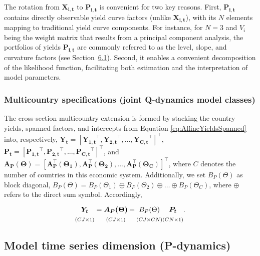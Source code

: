 The rotation from \(\boldsymbol{X_{i,t}}\) to \(\boldsymbol{P_{i,t}}\) is convenient for two key reasons. First, \(\boldsymbol{P_{i,t}}\) contains directly observable yield curve factors (unlike \(\boldsymbol{X_{i,t}}\)), with its \(N\) elements mapping to traditional yield curve components. For instance, for \(N=3\) and \(V_i\) being the weight matrix that results from a principal component analysis, the portfolios of yields \(\boldsymbol{P_{i,t}}\) are commonly referred to as the level, slope, and curvature factors (see Section~\hyperref[S:SpaFac]{6.1}). Second, it enables a convenient decomposition of the likelihood function, facilitating both estimation and the interpretation of model parameters.

\subsubsection{Multicountry specifications (joint Q-dynamics model classes)}\label{multicountry-specifications-joint-q-dynamics-model-classes}

The cross-section multicountry extension is formed by stacking the country yields, spanned factors, and intercepts from Equation \eqref{eq:AffineYieldsSpanned} into, respectively, \(\boldsymbol{Y_t}=[\boldsymbol{Y_{1,t}}^\top, \boldsymbol{Y_{2,t}}^\top, ...,\boldsymbol{Y_{C,t}}^\top]^\top\), \(\boldsymbol{P_t}=[\boldsymbol{P_{1,t}}^\top, \boldsymbol{P_{2,t}}^\top, ..., \boldsymbol{P_{C,t}}^\top]^\top\), and \(\boldsymbol{A_P(\Theta)}=[\boldsymbol{A_P^\top(\Theta_1)}, \boldsymbol{A_P^\top(\Theta_2)}, ..., \boldsymbol{A_P^\top(\Theta_C)}]^\top\), where \(C\) denotes the number of countries in this economic system. Additionally, we set \(B_{P}(\Theta)\) as block diagonal, \(B_P(\Theta)=B_P(\Theta_1) \oplus  B_P(\Theta_2) \oplus \dots \oplus B_P(\Theta_C)\), where \(\oplus\) refers to the direct sum symbol. Accordingly,
\begin{equation}
    \underset{(CJ \times 1)}{\vphantom{\Big|}
    \boldsymbol{Y_{t}}} =
    \underset{(CJ \times 1)}{\vphantom{\Big|}
    \boldsymbol{A_{P}(\Theta)}} +
    \underset{(CJ \times CN)}{\vphantom{\Big|}
    B_{P}(\Theta)}
    \underset{(CN \times 1)}{\vphantom{\Big|}
    \boldsymbol{P_{t}}}\text{.}
    \label{eq:AffineYieldsSpannedMultiCountry}
\end{equation}

\subsection{Model time series dimension (P-dynamics)}\label{S:Pdyn}

